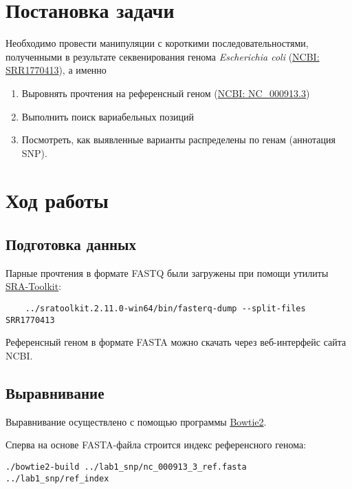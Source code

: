 \documentclass[a4paper,12pt]{article}
\begin{document}


\section{Постановка задачи}

Необходимо провести манипуляции с короткими последовательностями, полученными в результате секвенирования генома \textit{Escherichia coli} (\href{https://www.ncbi.nlm.nih.gov/sra/?term=SRR1770413}{NCBI: SRR1770413}), а именно
\begin{enumerate}[noitemsep]
    \item Выровнять прочтения на референсный геном (\href{https://www.ncbi.nlm.nih.gov/nuccore/NC_000913.3}{NCBI: NC\_000913.3})
    \item Выполнить поиск вариабельных позиций
    \item Посмотреть, как выявленные варианты распределены по генам (аннотация SNP).
\end{enumerate}

\section{Ход работы}

\subsection{Подготовка данных}
Парные прочтения в формате FASTQ были загружены при помощи утилиты \href{https://github.com/ncbi/sra-tools/wiki/01.-Downloading-SRA-Toolkit}{SRA-Toolkit}:
\begin{lstlisting}
    ../sratoolkit.2.11.0-win64/bin/fasterq-dump --split-files SRR1770413
\end{lstlisting}
Референсный геном в формате FASTA можно скачать через веб-интерфейс сайта NCBI.

\subsection{Выравнивание}

Выравнивание осуществлено с помощью программы \href{https://sourceforge.net/projects/bowtie-bio/files/bowtie2/}{Bowtie2}.

Сперва на основе FASTA-файла строится индекс референсного генома:

\begin{lstlisting}
./bowtie2-build ../lab1_snp/nc_000913_3_ref.fasta ../lab1_snp/ref_index
\end{lstlisting}
\end{document}
